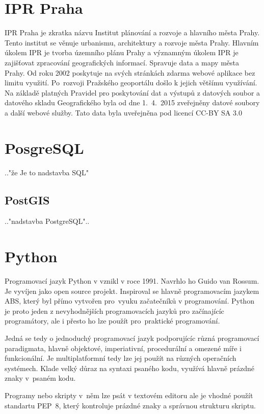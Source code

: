\section{IPR Praha}
\label{IPR Praha}
IPR Praha je zkratka názvu Institut plánování a rozvoje a hlavního města Prahy. 
Tento institut se věnuje urbanismu, architektury a rozvoje města Prahy. Hlavním
úkolem IPR je tvorba územního plánu Prahy a významným úkolem IPR je zajišťovat
zpracování geografických informací. Spravuje data a mapy města Prahy. Od roku 
2002 poskytuje na svých stránkách zdarma webové aplikace bez limitu využití. 
Po~rozvoji Pražského geoportálu došlo k jejich většímu využívání.  Na základě 
platných Pravidel pro poskytování dat a  výstupů z datových soubor a datového 
skladu Geografického byla od dne 1.~4.~2015 zveřejněny datové soubory a další 
webové služby. Tato data byla uveřejněna pod licencí CC-BY SA 3.0 \cite{IPR}


\section{PosgreSQL}
\label{PostgreSQL}
.."že Je to nadstavba SQL"


\subsection{PostGIS}
\label{PostGIS}
.."nadstavba PostgreSQL"..

\section{Python}
\label{Python}
Programovací jazyk Python v vznikl v roce 1991. Navrhlo ho Guido van Rossum. 
Je vyvíjen jako open source projekt. Inspiroval se hlavně programovacím jazykem
ABS, který byl přímo vytvořen pro~vyuku začatečníků v programování. Python je 
proto jeden z nevyhodnějších programovacích jazyků pro začínajícíc programátory,
ale i přesto ho lze použít pro~praktické programování. 

Jedná se tedy o jednoduchý programovací jazyk podporujícíc různá programovací 
paradigmata, hlavně objektové, imperiativní, procedurální a omezené míře i 
funkcionální. Je multiplatformní tedy lze jej použít na různých operačních 
systémech. Klade velký důraz na syntaxi psaného kodu, využívá hlavně prázdné 
znaky v~psaném kodu.  

Programy nebo skripty v~něm lze psát v textovém editoru ale je vhodné použít 
standartu PEP~8, který kontroluje prázdné znaky a správnou strukturu skriptu. 

